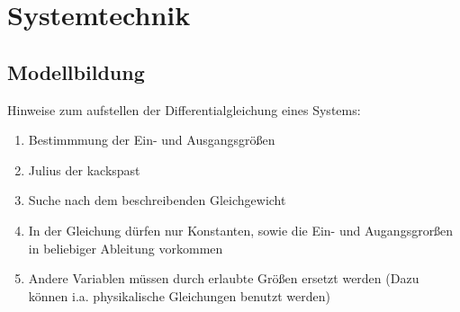\documentclass[10pt,a4paper]{article}
\begin{document}
  \section{Systemtechnik}
  \subsection{Modellbildung}
  Hinweise zum aufstellen der Differentialgleichung eines Systems:
  \begin{mdframed}[style=exercise]
  \begin{enumerate}
      \item Bestimmmung der Ein- und Ausgangsgrößen
      \item Julius der kackspast
      \item Suche nach dem beschreibenden Gleichgewicht
      \item In der Gleichung dürfen nur Konstanten, sowie die Ein- und
          Augangsgrorßen in beliebiger Ableitung vorkommen
      \item Andere Variablen müssen durch erlaubte Größen ersetzt werden (Dazu
          können i.a. physikalische Gleichungen benutzt werden)
    \end{enumerate}
\end{mdframed}
\end{document}
